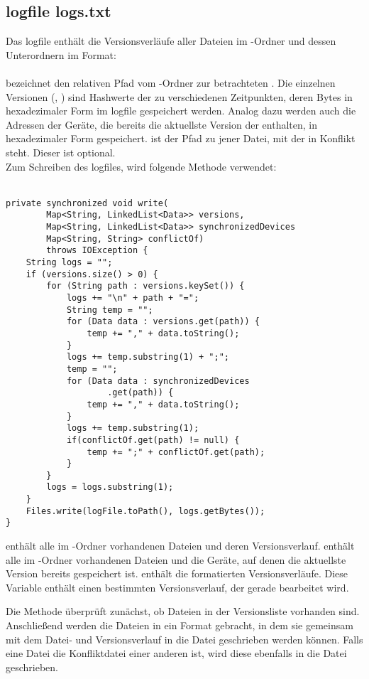 \subsection{\gls{logfile} logs.txt}
Das \gls{logfile}   enthält die Versionsverläufe aller Dateien im \sblit-Ordner und dessen Unterordnern im Format: \\  \\
 bezeichnet den relativen Pfad vom \sblit-Ordner zur betrachteten . Die einzelnen Versionen (, ) sind Hashwerte der  zu verschiedenen Zeitpunkten, deren Bytes in hexadezimaler Form im \gls{logfile} gespeichert werden. Analog dazu werden auch die Adressen der Geräte, die bereits die aktuellste Version der  enthalten, in hexadezimaler Form gespeichert.  ist der Pfad zu jener Datei, mit der  in Konflikt steht. Dieser ist optional.\\
Zum Schreiben des \gls{logfile}s, wird folgende Methode verwendet: \\ \\
\javalisting
\begin{minipage}{\linewidth}
\begin{lstlisting}[caption={Schreiben des Logfiles \datei{logs.txt}},captionpos=b]
private synchronized void write(
		Map<String, LinkedList<Data>> versions,
		Map<String, LinkedList<Data>> synchronizedDevices
		Map<String, String> conflictOf)
		throws IOException {
	String logs = "";
	if (versions.size() > 0) {
		for (String path : versions.keySet()) {
			logs += "\n" + path + "=";
			String temp = "";
			for (Data data : versions.get(path)) {
				temp += "," + data.toString();
			}
			logs += temp.substring(1) + ";";
			temp = "";
			for (Data data : synchronizedDevices
					.get(path)) {
				temp += "," + data.toString();
			}
			logs += temp.substring(1);
			if(conflictOf.get(path) != null) {
				temp += ";" + conflictOf.get(path);
			}
		}
		logs = logs.substring(1);
	}
	Files.write(logFile.toPath(), logs.getBytes());
}
\end{lstlisting}
\end{minipage}
\begin{description}
	 enthält alle im \sblit-Ordner vorhandenen Dateien und deren Versionsverlauf.
	 enthält alle im \sblit-Ordner vorhandenen Dateien und die Geräte, auf denen die aktuellste Version bereits gespeichert ist.
	 enthält die formatierten Versionsverläufe.
	Diese Variable enthält einen bestimmten Versionsverlauf, der gerade bearbeitet wird.
\end{description}
Die Methode  überprüft zunächst, ob Dateien in der Versionsliste  vorhanden sind. Anschließend werden die Dateien in ein Format gebracht, in dem sie gemeinsam mit dem Datei- und Versionsverlauf in die Datei geschrieben werden können. Falls eine Datei die Konfliktdatei einer anderen ist, wird diese ebenfalls in die Datei geschrieben.

